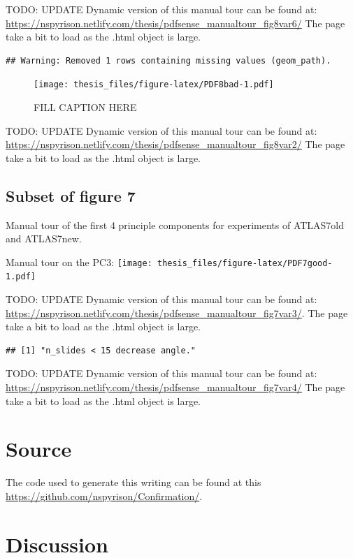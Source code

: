 \documentclass{monashthesis}
\begin{document}
TODO: UPDATE
Dynamic version of this manual tour can be found at:
\url{https://nspyrison.netlify.com/thesis/pdfsense_manualtour_fig8var6/}
The page take a bit to load as the .html object is large.

\begin{verbatim}
## Warning: Removed 1 rows containing missing values (geom_path).
\end{verbatim}

\begin{figure}
\centering
\texttt{[image: thesis\_files/figure-latex/PDF8bad-1.pdf]}
\caption{\label{fig:PDF8bad}FILL CAPTION HERE}
\end{figure}

TODO: UPDATE
Dynamic version of this manual tour can be found at:
\url{https://nspyrison.netlify.com/thesis/pdfsense_manualtour_fig8var2/}
The page take a bit to load as the .html object is large.

\hypertarget{subset-of-figure-7}{%
\subsection{Subset of figure 7}\label{subset-of-figure-7}}

Manual tour of the first 4 principle components for experiments of ATLAS7old and ATLAS7new.

Manual tour on the PC3:
\texttt{[image: thesis\_files/figure-latex/PDF7good-1.pdf]}

TODO: UPDATE
Dynamic version of this manual tour can be found at:
\url{https://nspyrison.netlify.com/thesis/pdfsense_manualtour_fig7var3/}.
The page take a bit to load as the .html object is large.

\begin{verbatim}
## [1] "n_slides < 15 decrease angle."
\end{verbatim}

TODO: UPDATE
Dynamic version of this manual tour can be found at:
\url{https://nspyrison.netlify.com/thesis/pdfsense_manualtour_fig7var4/}
The page take a bit to load as the .html object is large.

\hypertarget{source}{%
\section{Source}\label{source}}

The code used to generate this writing can be found at this \url{https://github.com/nspyrison/Confirmation/}.

\hypertarget{discussion}{%
\section{Discussion}\label{discussion}}
\end{document}
